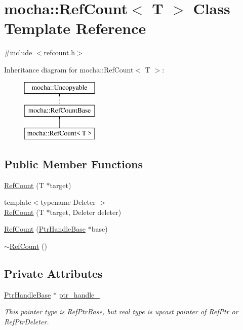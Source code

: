 \hypertarget{classmocha_1_1_ref_count}{
\section{mocha::RefCount$<$ T $>$ Class Template Reference}
\label{classmocha_1_1_ref_count}
}


{\ttfamily \#include $<$refcount.h$>$}

Inheritance diagram for mocha::RefCount$<$ T $>$:\begin{figure}[H]
\begin{center}
\leavevmode
\includegraphics[height=3.000000cm]{classmocha_1_1_ref_count}
\end{center}
\end{figure}
\subsection*{Public Member Functions}
\begin{DoxyCompactItemize}
\item 
\hyperlink{classmocha_1_1_ref_count_ab98ec350481d71201e7238a0374c48c8}{RefCount} (T $\ast$target)
\item 
{\footnotesize template$<$typename Deleter $>$ }\\\hyperlink{classmocha_1_1_ref_count_a0ce410ae928132a0b19657455ac386ce}{RefCount} (T $\ast$target, Deleter deleter)
\item 
\hyperlink{classmocha_1_1_ref_count_a9fa6159abf35569f565560e966a506a4}{RefCount} (\hyperlink{classmocha_1_1_ptr_handle_base}{PtrHandleBase} $\ast$base)
\item 
\hyperlink{classmocha_1_1_ref_count_af8f55fed6c5dd09e75a7ab8f770c106a}{$\sim$RefCount} ()
\end{DoxyCompactItemize}
\subsection*{Private Attributes}
\begin{DoxyCompactItemize}
\item 
\hyperlink{classmocha_1_1_ptr_handle_base}{PtrHandleBase} $\ast$ \hyperlink{classmocha_1_1_ref_count_ad821e295b1ca024e6304b40f7c0b0ac6}{ptr\_\-handle\_\-}
\begin{DoxyCompactList}\small\item\em This pointer type is RefPtrBase, but real type is upcast pointer of RefPtr or RefPtrDeleter. \end{DoxyCompactList}\end{DoxyCompactItemize}


